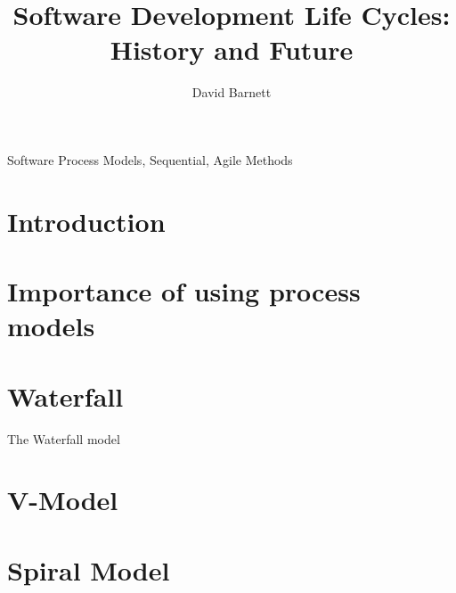 \documentclass{style/CRPITStyle}
\renewcommand{\cite}{\citep}
\begin{document}
\title{Software Development Life Cycles: History and Future}
\author{David Barnett}

\maketitle

\begin{abstract}
\end{abstract}
\vspace{.1in}

 Software Process Models, Sequential, Agile Methods

\vspace{.1in}

\section{Introduction}

\section{Importance of using process models}

\section{Waterfall} %

The Waterfall model \cite{Waterfall:1970}

\section{V-Model} %

\section{Spiral Model} %
\end{document}

